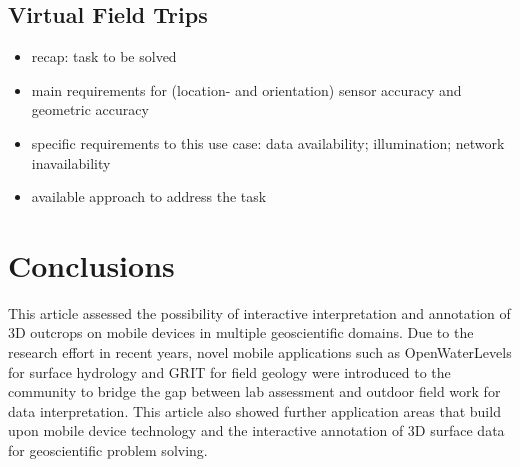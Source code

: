 \documentclass[review]{elsarticle}
\begin{document}
\subsection{Virtual Field Trips}

\begin{itemize}
\item recap: task to be solved
\item main requirements for (location- and orientation) sensor accuracy and geometric accuracy
\item specific requirements to this use case: data availability; illumination; network inavailability
\item available approach to address the task
\end{itemize}

%


\section{Conclusions}
\label{sec:conclusions}

This article assessed the possibility of interactive interpretation and annotation of 3D outcrops on mobile devices in multiple geoscientific domains. Due to the research effort in recent years, novel mobile applications such as OpenWaterLevels for surface hydrology and \gls{GRIT} for field geology were introduced to the community to bridge the gap between lab assessment and outdoor field work for data interpretation. This article also showed further application areas that build upon mobile device technology and the interactive annotation of 3D surface data for geoscientific problem solving.
\end{document}
